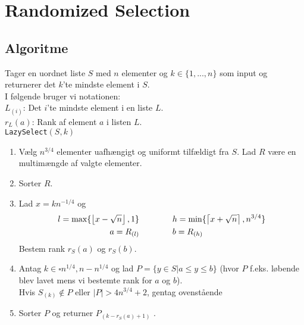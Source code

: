 \section{Randomized Selection}
\subsection{Algoritme}
Tager en uordnet liste $S$ med $n$ elementer og $k \in \{1, ..., n\}$ som input og returnerer det $k$'te mindste element i $S$.\\

I følgende bruger vi notationen:\\
$L_{(i)}$: Det $i$'te mindste element i en liste $L$.\\
$r_L(a)$: Rank af element $a$ i listen $L$.\\


\texttt{LazySelect}$(S, k)$
\begin{enumerate}
  \item Vælg $n^{3/4}$ elementer uafhængigt og uniformt tilfældigt fra $S$. Lad $R$ være en multimængde af valgte elementer.
  \item Sorter $R$.
  \item Lad $x = kn^{-1/4}$ og
  \begin{align*}
    l = \max\{\left\lfloor x - \sqrt{n} \right\rfloor, 1\}
    \quad\quad & \quad\quad
    h = \min\{\left\lceil x + \sqrt{n} \right\rceil, n^{3/4} \} \\
    a = R_{(l)}
    \quad\quad & \quad\quad
    b = R_{(h)}
  \end{align*}
  Bestem rank $r_S(a)$ og $r_S(b)$.
  \item Antag $k \in \square{ n^{1/4}, n-n^{1/4} }$ og lad $P = \{ y \in S | a \leq y \leq b \}$ (hvor $P$ f.eks. løbende blev lavet mens vi bestemte rank for $a$ og $b$).\\
  Hvis $S_{(k)} \notin P$ eller $|P| > 4n^{3/4}+2$, gentag ovenstående
  \item Sorter $P$ og returner $P_{(k - r_S(a) + 1)}$ .
\end{enumerate}
